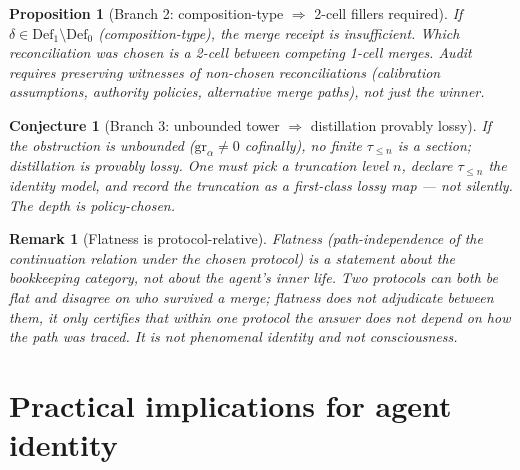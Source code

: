 \documentclass[11pt]{article}
\newtheorem{conjecture}{Conjecture}
\newtheorem{proposition}{Proposition}
\newtheorem{remark}{Remark}
\begin{document}
\begin{proposition}[Branch 2: composition-type $\Rightarrow$ 2-cell fillers required]
\label{prop:branch2}
If $\delta \in \mathrm{Def}_1 \setminus \mathrm{Def}_0$ (composition-type), the merge receipt
is insufficient. Which reconciliation was chosen is a 2-cell between competing 1-cell merges.
Audit requires preserving witnesses of \emph{non-chosen} reconciliations (calibration
assumptions, authority policies, alternative merge paths), not just the winner.
\end{proposition}

\begin{conjecture}[Branch 3: unbounded tower $\Rightarrow$ distillation provably lossy]
\label{conj:branch3}
If the obstruction is unbounded ($\mathrm{gr}_\alpha \neq 0$ cofinally), no finite
$\tau_{\le n}$ is a section; distillation is provably lossy. One must pick a truncation level
$n$, declare $\tau_{\le n}$ the identity model, and record the truncation as a first-class lossy
map --- not silently. The depth is policy-chosen.
\end{conjecture}

\begin{remark}[Flatness is protocol-relative]
\label{rem:flatness-protocol}
Flatness (path-independence of the continuation relation under the chosen protocol) is a
statement about the \emph{bookkeeping category}, not about the agent's inner life. Two
protocols can both be flat and disagree on who survived a merge; flatness does not adjudicate
between them, it only certifies that within one protocol the answer does not depend on how
the path was traced. It is not phenomenal identity and not consciousness.
\end{remark}

\section{Practical implications for agent identity}
\end{document}

